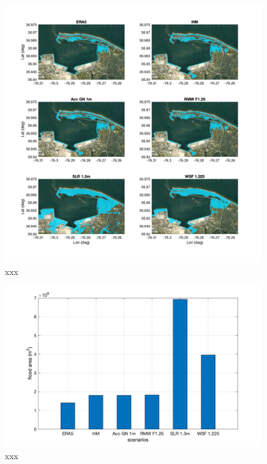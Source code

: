 \documentclass[preprint,12pt,authoryear]{elsarticle}
\begin{document}
\begin{figure}
\centering
\includegraphics[width=\textwidth]{./figures/nearcom_flood.jpg}
\caption{xxx }
\label{boundary}
\centering
\end{figure}

\begin{figure}
\centering
\includegraphics[width=\textwidth]{./figures/nearcom_bars.jpg}
\caption{xxx }
\label{boundary}
\centering
\end{figure}

\end{document}
